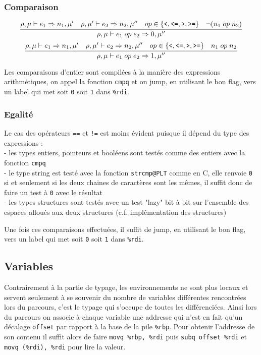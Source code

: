 \documentclass[9pt,a4paper]{article}
\begin{document}
\subsubsection*{Comparaison}
\vspace{-1em}

$$\infer{\rho, \mu \vdash e_1 \; op \; e_2 \Rightarrow 0, \mu ''}{\rho, \mu \vdash e_1 \Rightarrow n_1, \mu ' & \rho, \mu ' \vdash e_2 \Rightarrow n_2, \mu '' & op \in \{\text{\texttt{<}}, \text{\texttt{<=}}, \text{\texttt{>}}, \text{\texttt{>=}}\} & \lnot (n_1 \; op \; n_2)}$$
$$\infer{\rho, \mu \vdash e_1 \; op \; e_2 \Rightarrow 1, \mu ''}{\rho, \mu \vdash e_1 \Rightarrow n_1, \mu ' & \rho, \mu ' \vdash e_2 \Rightarrow n_2, \mu '' & op \in \{\text{\texttt{<}}, \text{\texttt{<=}}, \text{\texttt{>}}, \text{\texttt{>=}}\} & n_1 \; op \; n_2}$$

Les comparaisons d'entier sont compilées à la manière des expressions arithmétiques, on appel la fonction \verb|cmpq| et on jump, en utilisant le bon flag, vers un label qui met soit \verb|0| soit \verb|1| dans \verb|%rdi|.

\subsubsection*{Egalité}

Le cas des opérateurs \verb|==| et \verb|!=| est moins évident puisque il dépend du type des expressions :\\
 - les types entiers, pointeurs et booléens sont testés comme des entiers avec la fonction \verb|cmpq|\\
 - le type string est testé avec la fonction \verb|strcmp@PLT| comme en C, elle renvoie \verb|0| si et seulement si les deux chaines de caractères sont les mêmes, il suffit donc de faire un test à \verb|0| avec le résultat\\
 - les types structures sont testés avec un test "lazy" bit à bit sur l'ensemble des espaces alloués aux deux structures (c.f. implémentation des structures)

Une fois ces comparaisons effectuées, il suffit de jump, en utilisant le bon flag, vers un label qui met soit \verb|0| soit \verb|1| dans \verb|%rdi|.

\subsection{Variables}

Contrairement à la partie de typage, les environnements ne sont plus locaux et servent seulement à se souvenir du nombre de variables différentes rencontrées lors du parcours, c'est le typage qui s'occupe de toutes les différenciées. Ainsi lors du parcours on associe à chaque variable une addresse qui n'est en fait qu'un décalage \verb|offset| par rapport à la base de la pile \verb|%rbp|. Pour obtenir l'addresse de son contenu il suffit alors de faire \verb|movq %rbp, %rdi| puis \verb|subq offset %rdi| et \verb|movq (%rdi), %rdi| pour lire la valeur.
\end{document}
